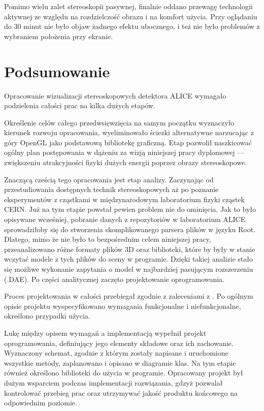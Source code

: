 Pomimo wielu zalet stereoskopii pasywnej, finalnie oddano przewagę technologii aktywnej ze względu na rozdzielczość obrazu i na komfort użycia. Przy oglądaniu do 30 minut nie było objaw żadnego efektu ubocznego, i też nie było problemów z wybraniem położenia przy ekranie.

\newpage
\section{Podsumowanie}
Opracowanie wizualizacji stereoskopowych detektora ALICE wymagało podzielenia całości prac na kilka dużych etapów.

Określenie celów całego przedwsięwzięcia na samym początku wyznaczyło kierunek rozwoju opracowania, wyeliminowało ściezki alternatywne narzucając z góry OpenGL jako podstawową bibliotekę graficzną. Etap pozwolił naszkicować ogólny plan postępowania w dążeniu za wizją niniejszej pracy dyplomowej --- zwiększeniu atrakcyjności fizyki dużych energii poprzez obrazy stereoskopowe. 

Znaczącą cześcią tego opracowania jest etap analizy. Zaczynając od przestudiowania dostępnych technik stereoskopowych aż po poznanie eksperymentów z cząstkami w międzynarodowym laboratorium fizyki cząstek CERN. Już na tym etapie powstał pewien problem nie do ominięcia. Jak to było opisywane wcześniej, pobranie danych z repozytoriów w laboratorium ALICE sprowadziłoby się do stworzenia skomplikowanego parsera plików w języku Root. Dlatego, mimo że nie było to bezpośrednim celem niniejszej pracy, przeanalizowano różne formaty plików 3D oraz biblioteki, które by były w stanie wczytać modele z tych plików do sceny w programie. Dzięki takiej analizie stało się możliwe wykonanie zapytania o model w najbardziej pasującym rozszerzeniu (.DAE). Po części analitycznej zaczęto projektowanie oprogramowania.

Proces projektowania w całości przebiegał zgodnie z zaleceniami z \cite{specyfikacja}. Po ogólnym opisie projektu wyspecyfikowano wymagania funkcjonalne i niefunkcjonalne, określono przypadki użycia.

Lukę między opisem wymagań a implementacją wypełnił projekt oprogramowania, definiujący jego elementy składowe oraz ich zachowanie. Wyznaczony schemat, zgodnie z którym zostały napisane i uruchomione wszystkie metody, zaplanowano i opisano w diagramie klas. Na tym etapie również określono biblioteki do użycia w programie. Opracowany projekt był dużym wsparciem podczas implementacji rozwiązania, gdzyż pozwalał kontrolować przebieg prac oraz utrzymywać jakość produktu końcowego na odpowiednim poziomie.


